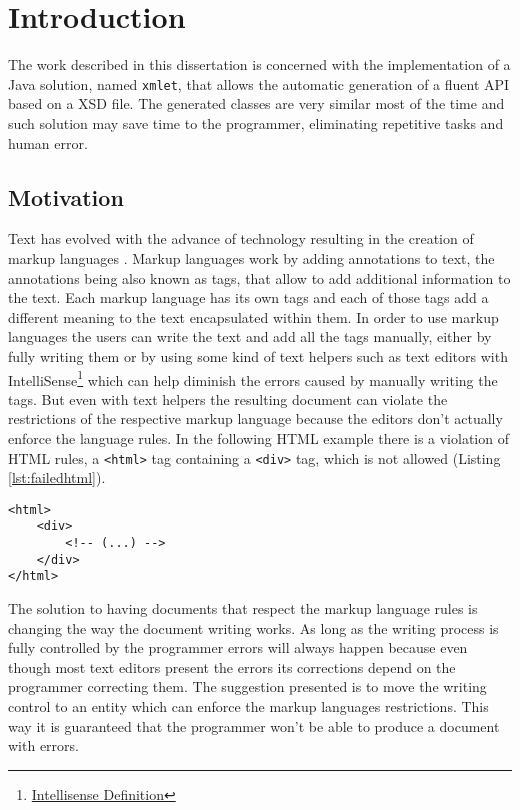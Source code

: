 \chapter{Introduction}
\label{cha:introduction}

The work described in this dissertation is concerned with the implementation of a Java solution, named \texttt{xmlet}, that allows the automatic generation of a fluent \ac{API} based on a \ac{XSD} file. The generated classes are very similar most of the time and such solution may save time to the programmer, eliminating repetitive tasks and human error.

\section{Motivation}

Text has evolved with the advance of technology resulting in the creation of markup languages \cite{markuplanguages}. Markup languages work by adding annotations to text, the annotations being also known as tags, that allow to add additional information to the text. Each markup language has its own tags and each of those tags add a different meaning to the text encapsulated within them. In order to use markup languages the users can write the text and add all the tags manually, either by fully writing them or by using some kind of text helpers such as text editors with IntelliSense\footnote{\href{https://www.techopedia.com/definition/24580/intellisense}{Intellisense Definition}} which can help diminish the errors caused by manually writing the tags. But even with text helpers the resulting document can violate the restrictions of the respective markup language because the editors don't actually enforce the language rules. In the following \ac{HTML} example there is a violation of \ac{HTML} rules, a \texttt{<html>} tag containing a \texttt{<div>} tag, which is not allowed (Listing \ref{lst:failedhtml}).

\bigskip

\lstset{language=HTML}

\begin{lstlisting}[caption={Failed HTML rule validation},captionpos=b,label={lst:failedhtml}]
<html>
    <div>
        <!-- (...) -->
    </div>
</html>
\end{lstlisting}

\noindent
The solution to having documents that respect the markup language rules is changing the way the document writing works. As long as the writing process is fully controlled by the programmer errors will always happen because even though most text editors present the errors its corrections depend on the programmer correcting them. The suggestion presented is to move the writing control to an entity which can enforce the markup languages restrictions. This way it is guaranteed that the programmer won't be able to produce a document with errors. 

